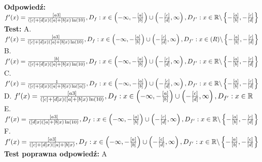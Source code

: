 \documentclass[12pt, a4paper]{article}
\theoremstyle{definition} %
\newcommand{\rozwStop}{\newline}                                            %
\newcommand{\odpStart}{\noindent \textbf{Odpowiedź:}\newline}    %
\newcommand{\odpStop}{\newline}                                             %
\newcommand{\testStart}{\noindent \textbf{Test:}\newline} %
\newcommand{\testStop}{\newline} %
\newcommand{\kluczStart}{\noindent \textbf{Test poprawna odpowiedź:}\newline} %
\newcommand{\kluczStop}{\newline} %
\begin{document}
\rozwStop
\odpStart
$f'(x)= \frac{[a3]}{([c]+[d]x) \left([a]+[b]x \right)\ln(10)}, D_f: x \in \left( -\infty , -\frac{[a]}{[b]} \right) \cup \left( -\frac{[c]}{[d]}, \infty \right) , \\ D_{f'}: x \in \mathbb{R} \backslash \left\{-\frac{[a]}{[b]}, -\frac{[c]}{[d]} \right\}$
\odpStop
\testStart
A. $f'(x)= \frac{[a3]}{([c]+[d]x) \left([a]+[b]x \right)\ln(10)}, D_f: x \in \left( -\infty , -\frac{[a]}{[b]} \right) \cup \left( -\frac{[c]}{[d]}, \infty \right) ,\\  D_{f'}: x \in \mathbb(R) \backslash \left\{-\frac{[a]}{[b]}, -\frac{[c]}{[d]} \right\}$\\
B. $f'(x)= \frac{[b]}{([c]+[d]x) \left([a]+[b]x \right)\ln(10)}, D_f: x \in \left( -\infty , -\frac{[a]}{[b]} \right) \cup \left( -\frac{[c]}{[d]}, \infty \right) , \\ D_{f'}: x \in \mathbb{R} \backslash \left\{-\frac{[a]}{[b]}, -\frac{[c]}{[d]} \right\}$\\
C. $f'(x)= \frac{1}{([c]+[d]x) \left([a]+[b]x \right)\ln([a])}, D_f: x \in \left( -\infty , -\frac{[a]}{[b]} \right) \cup \left( -\frac{[c]}{[d]}, \infty \right) , \\ D_{f'}: x \in \mathbb{R} \backslash \left\{-\frac{[a]}{[b]}, -\frac{[c]}{[d]} \right\}$\\
D. $f'(x)= \frac{[a3]}{([c]+[d]x) \left([a]+[b]x \right)\ln(10)}, D_f: x \in \left( -\infty , -\frac{[a]}{[b]} \right) \cup \left( -\frac{[c]}{[d]}, \infty \right) , \\ D_{f'}: x \in \mathbb{R} $\\
E. $f'(x)= \frac{[a3]}{([d]x) \left([a]+[b]x \right)\ln(10)}, D_f: x \in \left( -\infty , -\frac{[a]}{[b]} \right) \cup \left( -\frac{[c]}{[d]}, \infty \right) , \\ D_{f'}: x \in \mathbb{R} \backslash \left\{-\frac{[a]}{[b]}, -\frac{[c]}{[d]} \right\}$\\
F. $f'(x)= \frac{[a3]}{([c]+[d]x) \left([a]+[b]x \right)}, D_f: x \in \left( -\infty , -\frac{[a]}{[b]} \right) \cup \left( -\frac{[c]}{[d]}, \infty \right) , \\ D_{f'}: x \in \mathbb{R} \backslash \left\{-\frac{[a]}{[b]}, -\frac{[c]}{[d]} \right\}$
\testStop
\kluczStart
A
\kluczStop
\end{document}
